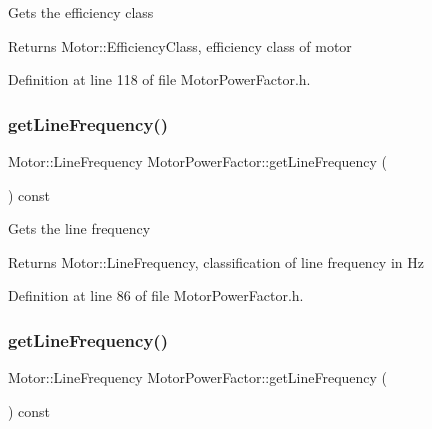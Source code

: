Gets the efficiency class \begin{DoxyReturn}{Returns}
Motor\+::\+Efficiency\+Class, efficiency class of motor 
\end{DoxyReturn}


Definition at line 118 of file Motor\+Power\+Factor.\+h.

\mbox{\label{class_motor_power_factor_aa4cdc420b1f611bcb9f4a69c69c1fabf}} 
\subsubsection{\texorpdfstring{get\+Line\+Frequency()}{getLineFrequency()}\hspace{0.1cm}{\footnotesize\ttfamily [1/3]}}
{\footnotesize\ttfamily Motor\+::\+Line\+Frequency Motor\+Power\+Factor\+::get\+Line\+Frequency (\begin{DoxyParamCaption}{ }\end{DoxyParamCaption}) const\hspace{0.3cm}{\ttfamily [inline]}}

Gets the line frequency \begin{DoxyReturn}{Returns}
Motor\+::\+Line\+Frequency, classification of line frequency in Hz 
\end{DoxyReturn}


Definition at line 86 of file Motor\+Power\+Factor.\+h.

\mbox{\label{class_motor_power_factor_aa4cdc420b1f611bcb9f4a69c69c1fabf}} 
\subsubsection{\texorpdfstring{get\+Line\+Frequency()}{getLineFrequency()}\hspace{0.1cm}{\footnotesize\ttfamily [2/3]}}
{\footnotesize\ttfamily Motor\+::\+Line\+Frequency Motor\+Power\+Factor\+::get\+Line\+Frequency (\begin{DoxyParamCaption}{ }\end{DoxyParamCaption}) const\hspace{0.3cm}{\ttfamily [inline]}}

